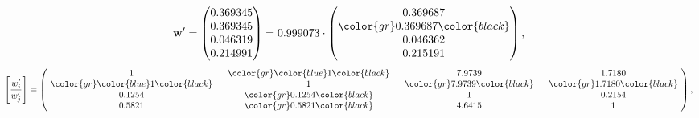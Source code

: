 \begin{example}
\begin{equation*}
\mathbf{w}^{\prime} =
\begin{pmatrix}
0.369345\\
0.369345\\
0.046319\\
0.214991
\end{pmatrix} =
0.999073\cdot
\begin{pmatrix}
0.369687\\
\color{gr} 0.369687\color{black} \\
0.046362\\
0.215191
\end{pmatrix},
\end{equation*}
\begin{equation*}
\left[ \frac{{w}^{\prime}_i}{{w}^{\prime}_j} \right] =
\begin{pmatrix}
$\,\,$ 1 $\,\,$ & $\,\,$\color{gr} \color{blue} 1\color{black} $\,\,$ & $\,\,$7.9739$\,\,$ & $\,\,$1.7180$\,\,$ \\
$\,\,$\color{gr} \color{blue} 1\color{black} $\,\,$ & $\,\,$ 1 $\,\,$ & $\,\,$\color{gr} 7.9739\color{black} $\,\,$ & $\,\,$\color{gr} 1.7180\color{black}   $\,\,$ \\
$\,\,$0.1254$\,\,$ & $\,\,$\color{gr} 0.1254\color{black} $\,\,$ & $\,\,$ 1 $\,\,$ & $\,\,$0.2154 $\,\,$ \\
$\,\,$0.5821$\,\,$ & $\,\,$\color{gr} 0.5821\color{black} $\,\,$ & $\,\,$4.6415$\,\,$ & $\,\,$ 1  $\,\,$ \\
\end{pmatrix},
\end{equation*}
\end{example}
\newpage
